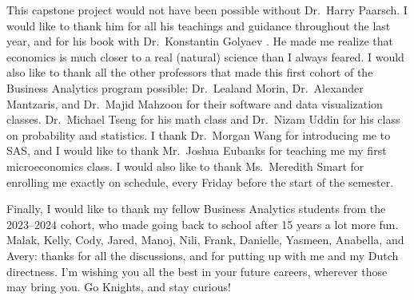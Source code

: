 This capstone project would not have been possible without Dr.~Harry Paarsch. 
I would like to thank him for all his teachings and guidance throughout the last year, and for his book with Dr.~Konstantin Golyaev \citep{paargoly:2016}.
He made me realize that economics is much closer to a real (natural) science than I always feared. 
I would also like to thank all the other professors that made this first cohort of the Business Analytics program possible: Dr.~Lealand Morin, Dr.~Alexander Mantzaris, and Dr.~Majid Mahzoon for their software and data visualization classes. 
Dr.~Michael Tseng for his math class and Dr.~Nizam Uddin for his class on probability and statistics. 
I thank Dr.~Morgan Wang for introducing me to SAS, and I would like to thank Mr.~Joshua Eubanks for teaching me my first microeconomics class.
I would also like to thank Ms.~Meredith Smart for enrolling me exactly on schedule, every Friday before the start of the semester.

Finally, I would like to thank my fellow Business Analytics students from the 2023--2024 cohort, who made going back to school after 15 years a lot more fun. 
Malak, Kelly, Cody, Jared, Manoj, Nili, Frank, Danielle, Yasmeen, Anabella, and Avery: thanks for all the discussions, and for putting up with me and my Dutch directness. 
I'm wishing you all the best in your future careers, wherever those may bring you. 
Go Knights, and stay curious! 
